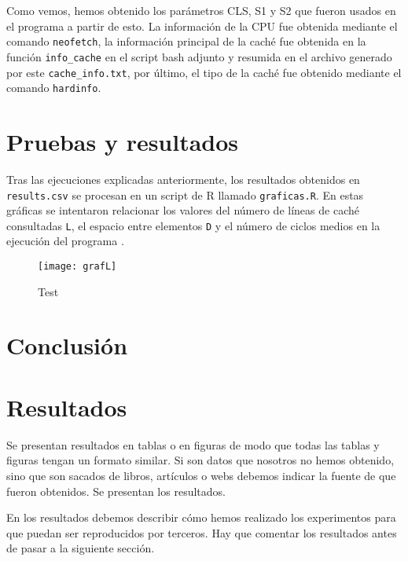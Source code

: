 \documentclass[a4paper,twocolumn]{article}
\begin{document}
    Como vemos, hemos obtenido los parámetros CLS, S1 y S2 que fueron usados en el programa a partir de esto. La información de la CPU fue obtenida mediante el comando \texttt{neofetch}, la información principal de la caché fue obtenida en la función \texttt{info\_cache} en el script bash adjunto y resumida en el archivo generado por este \texttt{cache\_info.txt}, por último, el tipo de la caché fue obtenido mediante el comando \texttt{hardinfo}.
    
	\section{Pruebas y resultados}
	Tras las ejecuciones explicadas anteriormente, los resultados obtenidos en \texttt{results.csv} se procesan en un script de \textsf{R} llamado \texttt{graficas.R}. En estas gráficas se intentaron relacionar los valores del número de líneas de caché consultadas \texttt{L}, el espacio entre elementos \texttt{D} y el número de ciclos medios en la ejecución del programa .
	
    \begin{figure*}
        \texttt{[image: grafL]}
        \caption{Test}
    \end{figure*}

	\section{Conclusión}
    
	
	
	
\section{Resultados}
Se presentan resultados en tablas o en figuras de modo que todas las tablas y figuras tengan un formato similar. Si son datos que nosotros no hemos obtenido, sino que son sacados de libros, artículos o webs debemos indicar la fuente de que fueron obtenidos. Se presentan los resultados.
	
En los resultados debemos describir cómo hemos realizado los experimentos para que puedan ser reproducidos por terceros. Hay que comentar los resultados antes de pasar a la siguiente sección. 
	
\end{document}

